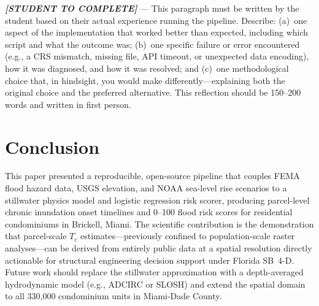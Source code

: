\documentclass[conference]{IEEEtran}
\begin{document}
\textit{\textbf{[STUDENT TO COMPLETE]}} — This paragraph must be written
by the student based on their actual experience running the pipeline.
Describe: (a)~one aspect of the implementation that worked better than
expected, including which script and what the outcome was; (b)~one
specific failure or error encountered (e.g., a CRS mismatch, missing
file, API timeout, or unexpected data encoding), how it was diagnosed,
and how it was resolved; and (c)~one methodological choice that, in
hindsight, you would make differently—explaining both the original
choice and the preferred alternative.
This reflection should be 150--200 words and written in first person.


\section{Conclusion}
\label{sec:conclusion}

This paper presented a reproducible, open-source pipeline that couples
FEMA flood hazard data, USGS elevation, and NOAA sea-level rise
scenarios to a stillwater physics model and logistic regression risk
scorer, producing parcel-level chronic inundation onset timelines
and 0--100 flood risk scores for residential condominiums in
Brickell, Miami.
The scientific contribution is the demonstration that parcel-scale
$T_c$ estimates—previously confined to population-scale raster
analyses—can be derived from entirely public data at a spatial
resolution directly actionable for structural engineering decision
support under Florida SB~4-D.
Future work should replace the stillwater approximation with a
depth-averaged hydrodynamic model (e.g., ADCIRC or SLOSH) and extend
the spatial domain to all 330,000 condominium units in Miami-Dade
County.
\end{document}
